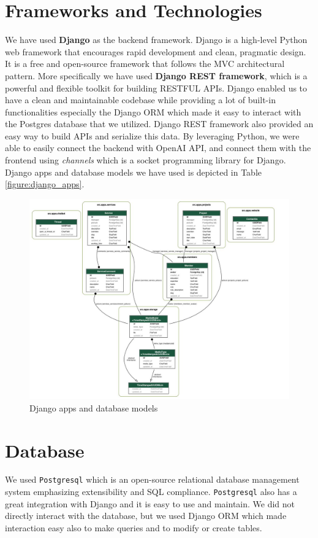 \section{Frameworks and Technologies}
We have used \textbf{Django} as the backend framework.
Django is a high-level Python web framework that encourages rapid development and clean, pragmatic design.
It is a free and open-source framework that follows the MVC architectural pattern.
More specifically we have used \textbf{Django REST framework}, which is a powerful and flexible toolkit for building RESTFUL APIs.
Django enabled us to have a clean and maintainable codebase while providing a lot of built-in functionalities especially the Django ORM which made it easy to interact with the Postgres database that we utilized. Django REST framework also provided  an easy way to build APIs and serialize this data.
By leveraging Python, we were able to easily connect the backend with OpenAI API, and connect them with the frontend using \textit{channels} which is a socket programming library for Django.
Django apps and database models we have used is depicted in Table \ref{figure:django_apps}.

\begin{figure}[htbp]
    \centering
    \includegraphics[width=0.4\linewidth]{img/django.jpeg}
    \caption{Django apps and database models}
    \label{fig:django_apps}
\end{figure}

\section{Database}
We used \texttt{Postgresql} which is an open-source relational database management system emphasizing extensibility and SQL compliance.
\texttt{Postgresql} also has a great integration with Django and it is easy to use and maintain.
We did not directly interact with the database, but we used Django ORM which made interaction easy also to make queries and to modify or create tables.

